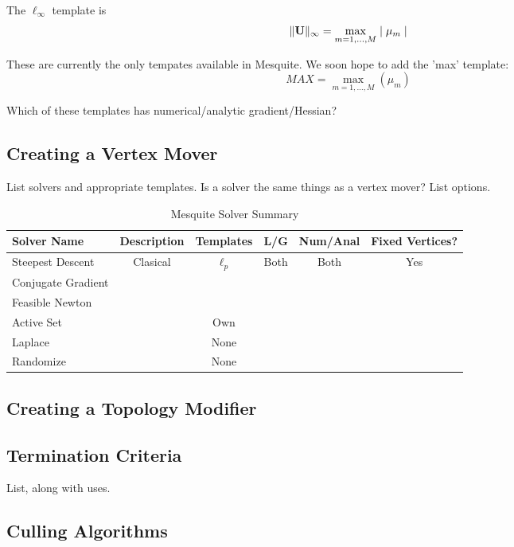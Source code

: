  \newline
The $\ell_{\infty}$ template is
\begin{equation}
\| {\bf U} \|_{\infty} = \max_{m=1,\ldots,M} \mid \mu_m \mid
\end{equation}

These are currently the only tempates available in Mesquite.
We soon hope to add the 'max' template:
\begin{equation}
MAX = \max_{m=1,\ldots,M} ( \mu_m )
\end{equation}

Which of these templates has numerical/analytic gradient/Hessian?

\subsection{Creating a Vertex Mover}
List solvers and appropriate templates. Is a solver the same things as a 
vertex mover? List options.

\begin{table}[h]
\begin{center}
\begin{tabular}{|l|c|c|c|c|c|}
\hline
Solver Name & Description & Templates & L/G & Num/Anal & Fixed Vertices? \\ \hline
Steepest Descent & Clasical & $\ell_p$ & Both & Both & Yes \\
Conjugate Gradient & & & & & \\
Feasible Newton & & & & & \\
Active Set & & Own & & & \\
Laplace & & None & & & \\
Randomize & & None & & & \\
\hline
\end{tabular}
\caption{\label{Solvers} Mesquite Solver Summary}
\end{center}
\end{table}


\subsection{Creating a Topology Modifier}

\subsection{Termination Criteria}
List, along with uses.

\subsection{Culling Algorithms}

